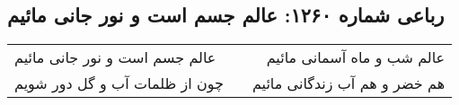 \begin{center}
\section*{رباعی شماره ۱۲۶۰: عالم جسم است و نور جانی مائیم}
\label{sec:1260}
\begin{longtable}{l p{0.5cm} r}
عالم جسم است و نور جانی مائیم
&&
عالم شب و ماه آسمانی مائیم
\\
چون از ظلمات آب و گل دور شویم
&&
هم خضر و هم آب زندگانی مائیم
\\
\end{longtable}
\end{center}
